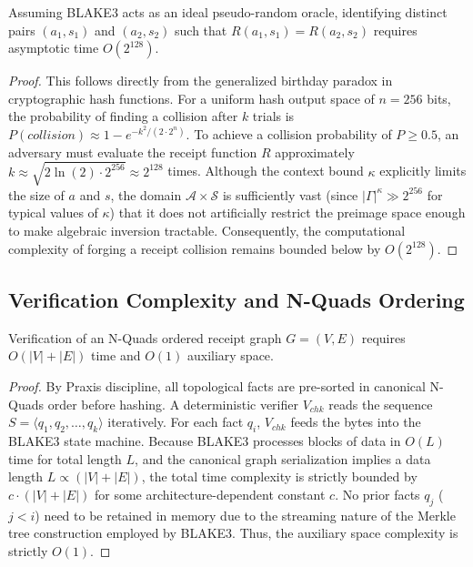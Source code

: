 \begin{theorem}
\label{thm:collision_resistance}
Assuming BLAKE3 acts as an ideal pseudo-random oracle, identifying distinct pairs $(a_1, s_1)$ and $(a_2, s_2)$ such that $R(a_1, s_1) = R(a_2, s_2)$ requires asymptotic time $O(2^{128})$.
\end{theorem}

\begin{proof}
This follows directly from the generalized birthday paradox in cryptographic hash functions. For a uniform hash output space of $n=256$ bits, the probability of finding a collision after $k$ trials is $P(collision) \approx 1 - e^{-k^2 / (2 \cdot 2^n)}$. 
To achieve a collision probability of $P \ge 0.5$, an adversary must evaluate the receipt function $R$ approximately $k \approx \sqrt{2 \ln(2) \cdot 2^{256}} \approx 2^{128}$ times. 
Although the context bound $\kappa$ explicitly limits the size of $a$ and $s$, the domain $\mathcal{A} \times \mathcal{S}$ is sufficiently vast (since $|\Gamma|^\kappa \gg 2^{256}$ for typical values of $\kappa$) that it does not artificially restrict the preimage space enough to make algebraic inversion tractable. Consequently, the computational complexity of forging a receipt collision remains bounded below by $O(2^{128})$.
\end{proof}

\subsection{Verification Complexity and N-Quads Ordering}

\begin{lemma}
\label{lem:linear_verification}
Verification of an N-Quads ordered receipt graph $G = (V, E)$ requires $O(|V| + |E|)$ time and $O(1)$ auxiliary space.
\end{lemma}

\begin{proof}
By Praxis discipline, all topological facts are pre-sorted in canonical N-Quads order before hashing. A deterministic verifier $V_{chk}$ reads the sequence $S = \langle q_1, q_2, \dots, q_k \rangle$ iteratively. 
For each fact $q_i$, $V_{chk}$ feeds the bytes into the BLAKE3 state machine. 
Because BLAKE3 processes blocks of data in $O(L)$ time for total length $L$, and the canonical graph serialization implies a data length $L \propto (|V| + |E|)$, the total time complexity is strictly bounded by $c \cdot (|V| + |E|)$ for some architecture-dependent constant $c$. No prior facts $q_j$ ($j < i$) need to be retained in memory due to the streaming nature of the Merkle tree construction employed by BLAKE3. Thus, the auxiliary space complexity is strictly $O(1)$.
\end{proof}

